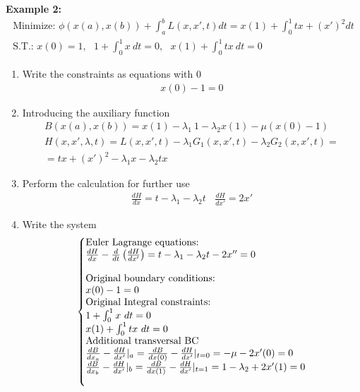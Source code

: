 \documentclass[a4paper,12pt]{article}
\makeatletter
\newenvironment{sistema}%
{\left\lbrace\begin{array}{@{}l@{}}}%
	{\end{array}\right.}
\makeatother
\begin{document}
{{			\textbf{Example 2:}
			\begin{gather*}
				\text{Minimize: } \phi(x(a),x(b)) + \int_a^b L(x,x',t)dt=x(1)+\int_0^1 tx+(x')^2 dt\\
				\text{S.T.: } x(0)=1,  \ \ \ 1+\int_0^1 x \ dt=0, \ \ \ x(1)+\int_0^1 tx \ dt =0
			\end{gather*} 
		\begin{enumerate}
				\item Write the constraints as equations with 0
					\begin{gather*}
				x(0)-1 = 0
			\end{gather*}
				\item Introducing the auxiliary function
					\begin{gather*}
				B(x(a),x(b))=x(1)- \lambda_1 \ 1 - \lambda_2 x(1)-\mu (x(0)-1)\\
				H(x,x',\lambda,t)=L(x,x',t)-\lambda_1 G_1(x,x',t)-\lambda_2 G_2(x,x',t)=\\
				=tx+(x')^2-\lambda_1x-\lambda_2tx
			\end{gather*}
				\item Perform the calculation for further use
					\begin{gather*}
				\frac{dH}{dx}=t -\lambda_1 -\lambda_2 t \ \ \ \ \frac{dH}{dx'}= 2 x'
			\end{gather*}
				\item  Write the system
			\begin{gather*} 
			\begin{sistema}
				\text{Euler Lagrange equations:}\\
				\frac{dH}{dx}-\frac{d}{dt}\left(\frac{dH}{dx'}\right)=t -\lambda_1 -\lambda_2 t-2x''=0\\ \\
				\text{Original boundary conditions:}\\
				x(0)-1 = 0\\ 
				\text{Original Integral constraints:}\\
				1+\int_0^1 x \ dt=0\\ 
				x(1)+\int_0^1 tx \ dt =0\\
				\text{Additional transversal BC}\\
				\frac{dB}{dx_a}-\frac{dH}{dx'}|_a=\frac{dB}{dx(0)}-\frac{dH}{dx'}|_{t=0}=-\mu -2x'(0) =0  \\
				\frac{dB}{dx_b}-\frac{dH}{dx'}|_b=\frac{dB}{dx(1)}-\frac{dH}{dx'}|_{t=1}=1- \lambda_2 +2x'(1) =0 \\ \\
			\end{sistema}
		\end{gather*}
	\end{enumerate}
	}}
\end{document}
